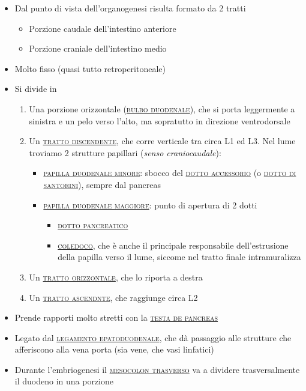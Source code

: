 \documentclass[italian,]{article}
\providecommand{\tightlist}{%
  \setlength{\itemsep}{0pt}\setlength{\parskip}{0pt}}
\renewcommand{\a}[1]{\underline{\textsc{#1}}}
\begin{document}
\begin{itemize}
\tightlist
\item
  Dal punto di vista dell'organogenesi risulta formato da 2 tratti

  \begin{itemize}
  \tightlist
  \item
    Porzione caudale dell'intestino anteriore
  \item
    Porzione craniale dell'intestino medio
  \end{itemize}
\item
  Molto fisso (quasi tutto retroperitoneale)
\item
  Si divide in

  \begin{enumerate}
  \def\labelenumi{\arabic{enumi}.}
  \tightlist
  \item
    Una porzione orizzontale (\a{bulbo duodenale}), che si porta
    leggermente a sinistra e un pelo verso l'alto, ma sopratutto in
    direzione ventrodorsale
  \item
    Un \a{tratto discendente}, che corre verticale tra circa L1 ed L3.
    Nel lume troviamo 2 strutture papillari (\emph{senso
    craniocaudale}):

    \begin{itemize}
    \tightlist
    \item
      \a{papilla duodenale minore}: sbocco del \a{dotto accessorio} (o
      \a{dotto di santorini}), sempre dal pancreas
    \item
      \a{papilla duodenale maggiore}: punto di apertura di 2 dotti

      \begin{itemize}
      \item
        \a{dotto pancreatico}
      \item
        \a{coledoco}, che è anche il principale responsabile
        dell'estrusione della papilla verso il lume, siccome nel tratto
        finale intramuralizza
      \end{itemize}
    \end{itemize}
  \item
    Un \a{tratto orizzontale}, che lo riporta a destra
  \item
    Un \a{tratto ascendnte}, che raggiunge circa L2
  \end{enumerate}
\item
  Prende rapporti molto stretti con la \a{testa de pancreas}
\item
  Legato dal \a{legamento epatoduodenale}, che dà passaggio alle
  strutture che afferiscono alla vena porta (sia vene, che vasi
  linfatici)
\item
  Durante l'embriogenesi il \a{mesocolon trasverso} va a dividere
  trasversalmente il duodeno in una porzione


\end{itemize}
\end{document}
